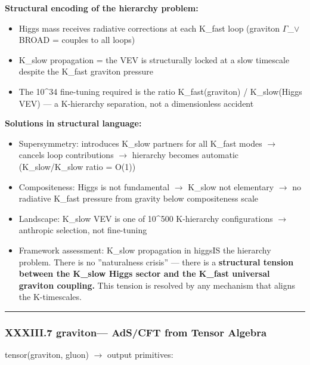 \documentclass[12pt,a4paper]{article}
\begin{document}
\textbf{Structural encoding of the hierarchy problem:}

\begin{itemize}
    \item Higgs mass receives radiative corrections at each K\_fast loop (graviton $\Gamma$\_$\lor$ BROAD = couples to all loops)
    \item K\_slow propagation = the VEV is structurally locked at a slow timescale despite the K\_fast graviton pressure
    \item The 10\^{}34 fine-tuning required is the ratio K\_fast(graviton) / K\_slow(Higgs VEV) --- a K-hierarchy separation, not a dimensionless accident
\end{itemize}

\textbf{Solutions in structural language:}

\begin{itemize}
    \item Supersymmetry: introduces K\_slow partners for all K\_fast modes $\rightarrow$ cancels loop contributions $\rightarrow$ hierarchy becomes automatic (K\_slow/K\_slow ratio = O(1))
    \item Compositeness: Higgs is not fundamental $\rightarrow$ K\_slow not elementary $\rightarrow$ no radiative K\_fast pressure from gravity below compositeness scale
    \item Landscape: K\_slow VEV is one of 10\^{}500 K-hierarchy configurations $\rightarrow$ anthropic selection, not fine-tuning
    \item Framework assessment: K\_slow propagation in higgs\otimesgraviton IS the hierarchy problem. There is no ''naturalness crisis'' --- there is a \textbf{structural tension between the K\_slow Higgs sector and the K\_fast universal graviton coupling.} This tension is resolved by any mechanism that aligns the K-timescales.
\end{itemize}

\begin{center}
\rule{0.5\textwidth}{0.4pt}
\end{center}

\subsubsection{XXXIII.7 graviton\otimesgluon --- AdS/CFT from Tensor Algebra}

tensor(graviton, gluon) $\rightarrow$ output primitives:
\end{document}
